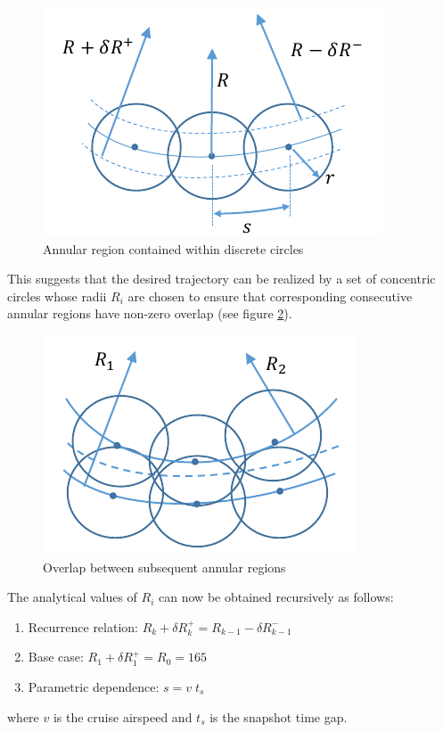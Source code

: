 \begin{figure}
\centering
\includegraphics[scale=0.75]{Figures/mission_phase1_a}
\caption{Annular region contained within discrete circles}
\label{fig_mission_phase1_a}
\end{figure}

This suggests that the desired trajectory can be realized by a set of concentric circles whose radii $R_i$ are chosen to ensure that corresponding consecutive annular regions have non-zero overlap (see figure \ref{fig_mission_phase1_b}).

\begin{figure}
\centering
\includegraphics[scale=0.75]{Figures/mission_phase1_b}
\caption{Overlap between subsequent annular regions}
\label{fig_mission_phase1_b}
\end{figure}

The analytical values of $R_i$ can now be obtained recursively as follows:
\begin{enumerate}
\item Recurrence relation: $ R_k + \delta R_k^+ = R_{k-1} - \delta R_{k-1}^-$
\item Base case: $ R_1 + \delta R_1^+ = R_0 = 165$
\item Parametric dependence: $s=v \; t_s$
\end{enumerate}
where $v$ is the cruise airspeed and $t_s$ is the snapshot time gap. 
 
